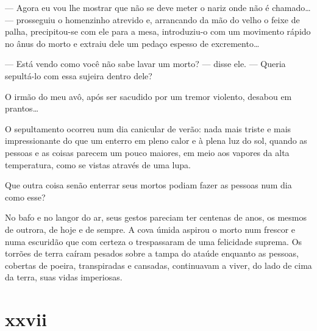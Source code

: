
--- Agora eu vou lhe mostrar que não se deve meter o nariz onde não é
    chamado\ldots{} --- prosseguiu o homenzinho atrevido e, arrancando da mão
    do velho o feixe de palha, precipitou-se com ele para a mesa,
    introduziu-o com um movimento rápido no ânus do morto e extraiu dele um
    pedaço espesso de excremento\ldots{}

--- Está vendo como você não sabe lavar um morto? --- disse ele. --- Queria
    sepultá-lo com essa sujeira dentro dele?

O irmão do meu avô, após ser sacudido por um tremor violento, desabou em
prantos\ldots{}

O sepultamento ocorreu num dia canicular de verão: nada mais triste e mais
impressionante do que um enterro em pleno calor e à plena luz do sol, quando
as pessoas e as coisas parecem um pouco maiores, em meio aos vapores da alta
temperatura, como se vistas através de uma lupa.

Que outra coisa senão enterrar seus mortos podiam fazer as pessoas num dia
como esse?

No bafo e no langor do ar, seus gestos pareciam ter centenas de anos, os
mesmos de outrora, de hoje e de sempre. A cova úmida aspirou o morto num
frescor e numa escuridão que com certeza o trespassaram de uma felicidade
suprema. Os torrões de terra caíram pesados sobre a tampa do ataúde enquanto
as pessoas, cobertas de poeira, transpiradas e cansadas, continuavam a viver,
do lado de cima da terra, suas vidas imperiosas. 


\section{xxvii} 

 



